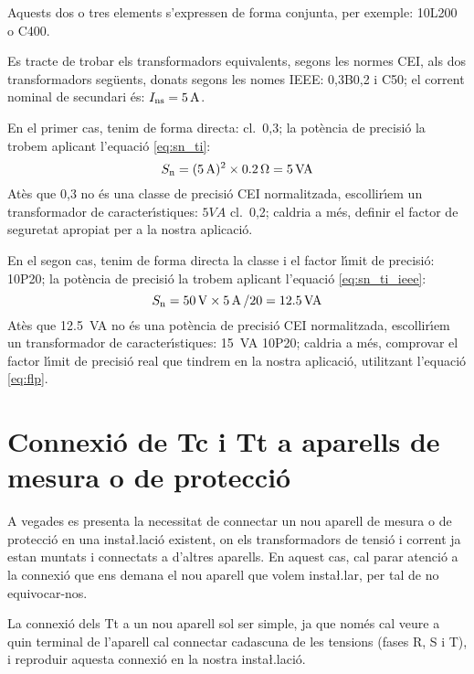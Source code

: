 Aquests dos o tres elements s'expressen de forma conjunta, per exemple:
10L200 o C400.


\begin{exemple}
    Es tracte de trobar els transformadors equivalents, segons les normes \textsf{CEI}, als dos
    transformadors seg\"{u}ents, donats segons les nomes \textsf{IEEE}: 0,3B0,2 i
    C50; el corrent nominal de secundari \'{e}s:    $I_\mathrm{ns}=5\mathrm{\,A}$.

    En el primer cas, tenim de forma directa: cl.~0,3; la pot\`{e}ncia de precisi\'{o} la trobem
    aplicant l'equaci\'{o} \eqref{eq:sn_ti}:
    \[
        S_\mathrm{n} =(\SI{5}{A})^2 \times \SI{0,2}{\ensuremath{\mathrm{\Omega}}} =  \SI{5}{VA}
    \]
    At\`{e}s que 0,3 no \'{e}s una classe de precisi\'{o} \textsf{CEI} normalitzada,
    escollir\'{\i}em un transformador de caracter\'{\i}stiques: $5\unit{VA}$ cl.~0,2; caldria a m\'{e}s, definir el factor de
    seguretat apropiat per a la nostra aplicaci\'{o}.

    En el segon cas, tenim de forma directa la classe i el factor l\'{\i}mit de
    precisi\'{o}: 10P20; la pot\`{e}ncia de precisi\'{o} la trobem
    aplicant l'equaci\'{o} \eqref{eq:sn_ti_ieee}:
    \[
        S_\mathrm{n} = \SI{50}{V} \times  \SI{5}{A}\, / 20 = \SI{12,5}{VA}
    \]
    At\`{e}s que \SI{12,5}{VA} no \'{e}s una pot\`{e}ncia de precisi\'{o} \textsf{CEI} normalitzada,
     escollir\'{\i}em un transformador de caracter\'{\i}stiques:
    \SI{15}{VA} 10P20; caldria a m\'{e}s, comprovar el factor l\'{\i}mit de precisi\'{o} real
    que tindrem en la nostra aplicaci\'{o}, utilitzant l'equaci\'{o} \eqref{eq:flp}.
\end{exemple}

\section{Connexi\'{o} de Tc i Tt a aparells de mesura o de
protecci\'{o}}\label{sec:conex_ti_tt}

A vegades es presenta la necessitat de connectar un nou aparell de
mesura o de protecci\'{o} en una insta{\l.l}aci\'{o} existent, on els
transformadors de tensi\'{o} i corrent ja estan muntats i connectats a
d'altres aparells. En aquest cas, cal parar atenci\'{o} a la connexi\'{o}
que ens demana el nou aparell que volem insta{\l.l}ar, per tal de no
equivocar-nos.

La connexi\'{o} dels Tt a un nou aparell sol ser simple, ja que nom\'{e}s
cal veure a quin terminal de l'aparell cal connectar cadascuna de
les tensions (fases R, S i T), i reproduir aquesta connexi\'{o} en la
nostra insta{\l.l}aci\'{o}.

